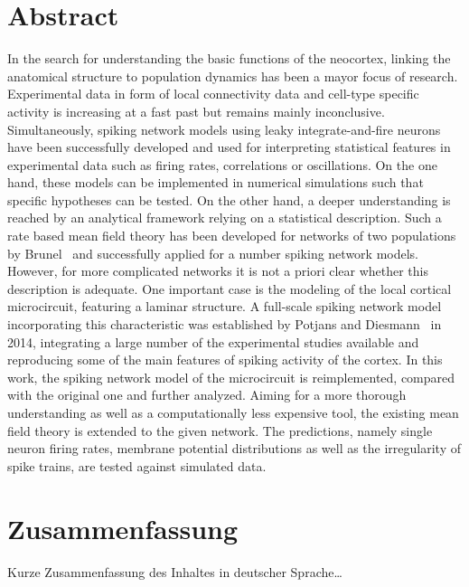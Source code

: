 \begingroup
\let\clearpage\relax
\let\cleardoublepage\relax
\let\cleardoublepage\relax

\chapter*{Abstract}
In the search for understanding the basic functions of the neocortex, 
linking the anatomical structure to population dynamics has been a mayor
focus of research. Experimental data in form of local connectivity data
and cell-type specific activity is increasing at a fast past but remains
mainly inconclusive. Simultaneously, spiking network models using 
leaky integrate-and-fire neurons 
have been successfully developed and used for interpreting 
statistical features in experimental data such as firing rates, 
correlations or oscillations. 
On the one hand, these models can be implemented in numerical 
simulations such that specific hypotheses can be tested. 
On the other hand, a deeper understanding is reached by 
an analytical framework relying on a statistical description.
Such a rate based mean field theory has been developed 
for networks of two populations
by Brunel~\cite{brunel2000} and successfully applied for a number 
spiking network models. However, for more complicated networks
it is not a priori clear whether this description is adequate. 
One important case is the modeling of the local cortical 
microcircuit, featuring a laminar structure. 
A full-scale spiking network model incorporating this characteristic
was established by Potjans and Diesmann~\cite{potjans2014} in 2014, 
integrating a large number of the experimental studies available and reproducing
some of the main features of spiking activity of the cortex.
In this work, the spiking network model of the microcircuit is reimplemented, 
compared with the original one and further analyzed.
Aiming for a more thorough understanding as well as a computationally less
expensive tool, the existing mean field theory is extended to the given network. 
The predictions, namely single neuron firing rates, 
membrane potential distributions as well as the irregularity of spike trains, 
are tested against simulated data. 

\vfill

\pagebreak
\chapter*{Zusammenfassung}
Kurze Zusammenfassung des Inhaltes in deutscher Sprache\dots


\endgroup			

\vfill
